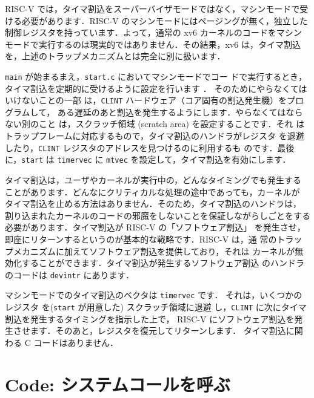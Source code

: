 RISC-V では，タイマ割込をスーパーバイザモードではなく，マシンモードで受
ける必要があります．RISC-V のマシンモードにはページングが無く，独立した
制御レジスタを持っています．よって，通常の xv6 カーネルのコードをマシン
モードで実行するのは現実的ではありません．その結果，xv6 は，タイマ割込
を，上述のトラップメカニズムとは完全に別に扱います．


\texttt{main} が始まるまえ，\texttt{start.c} においてマシンモードでコー
ドで実行するとき，タイマ割込を定期的に受けるように設定を行います
．
そのためにやらなくてはいけないことの一部
は，\texttt{CLINT} ハードウェア（コア固有の割込発生機）をプログラムして，
ある遅延のあと割込を発生するようにします．やらなくてはならない別のこと
は，スクラッチ領域 (scratch area) を設定することです．それ
はトラップフレームに対応するもので，タイマ割込のハンドラがレジスタ
を退避したり，\texttt{CLINT} レジスタのアドレスを見つけるのに利用するも
のです．最後に，\texttt{start} は \texttt{timervec} に \texttt{mtvec}
を設定して，タイマ割込を有効にします．

タイマ割込は，ユーザやカーネルが実行中の，どんなタイミングでも発生する
ことがあります．どんなにクリティカルな処理の途中であっても，カーネルが
タイマ割込を止める方法はありません．そのため，タイマ割込のハンドラは，
割り込まれたカーネルのコードの邪魔をしないことを保証しながらしごとをする
必要があります．タイマ割込が RISC-V の「ソフトウェア割込」
を発生させ，即座にリターンするというのが基本的な戦略です．RISC-V は，通
常のトラップメカニズムに加えてソフトウェア割込を提供しており，それは
カーネルが無効化することができます．タイマ割込が発生するソフトウェア割込
のハンドラのコードは \texttt{devintr} 
 にあります．

マシンモードでのタイマ割込のベクタは \texttt{timervec}
 です．
それは，いくつかのレジスタ
を(\texttt{start} が用意した) スクラッチ領域に退避
し，\texttt{CLINT} に次にタイマ割込を発生するタイミングを指示した上で，
RISC-V にソフトウェア割込を発生させます．そのあと，レジスタを復元してリターンします．
タイマ割込に関わる C コードはありません．

\section{Code: システムコールを呼ぶ}

